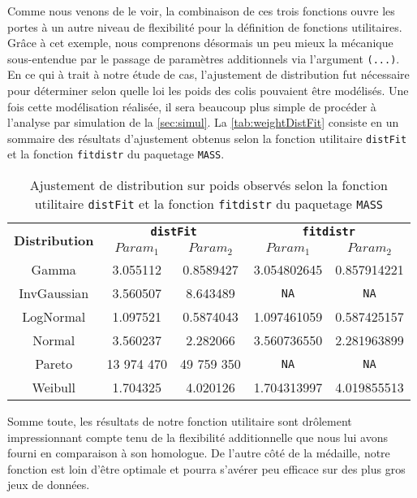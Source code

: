 Comme nous venons de le voir, la combinaison de ces trois fonctions ouvre les portes à un autre niveau de flexibilité pour la définition de fonctions utilitaires. Grâce à cet exemple, nous comprenons désormais un peu mieux la mécanique sous-entendue par le passage de paramètres additionnels via l'argument \texttt{(...)}. \\

En ce qui à trait à notre étude de cas, l'ajustement de distribution fut nécessaire pour déterminer selon quelle loi les poids des colis pouvaient être modélisés. Une fois cette modélisation réalisée, il sera beaucoup plus simple de procéder à l'analyse par simulation de la \autoref{sec:simul}. La \autoref{tab:weightDistFit} consiste en un sommaire des résultats d'ajustement obtenus selon la fonction utilitaire \texttt{distFit} et la fonction \texttt{fitdistr} du paquetage \texttt{MASS}. \\

\begin{table}
	\centering
	\begin{tabular}{ccccc}
		\multirow{2}{*}{\textbf{Distribution}} & \multicolumn{2}{c}{\textbf{\texttt{distFit}}} & \multicolumn{2}{c}{\textbf{\texttt{fitdistr}}} \\
		& \textbf{$Param_1$} & \textbf{$Param_2$} & \textbf{$Param_1$} & \textbf{$Param_2$} \\
		\hline
		Gamma & 3.055112 & 0.8589427 & 3.054802645 & 0.857914221 \\
		InvGaussian & 3.560507 & 8.643489 & \texttt{NA} & \texttt{NA} \\
		LogNormal & 1.097521 & 0.5874043 & 1.097461059 & 0.587425157 \\
		Normal & 3.560237 & 2.282066 & 3.560736550 & 2.281963899 \\
		Pareto & 13 974 470 & 49 759 350 & \texttt{NA} & \texttt{NA} \\
		Weibull & 1.704325 & 4.020126 & 1.704313997 & 4.019855513 \\	
	\end{tabular}
	\caption{Ajustement de distribution sur poids observés selon la fonction utilitaire \texttt{distFit} et la fonction \texttt{fitdistr} du paquetage \texttt{MASS}}
	\label{tab:weightDistFit}
\end{table} 


Somme toute, les résultats de notre fonction utilitaire sont drôlement impressionnant compte tenu de la flexibilité additionnelle que nous lui avons fourni en comparaison à son homologue. De l'autre côté de la médaille, notre fonction est loin d'être optimale et pourra s'avérer peu efficace sur des plus gros jeux de données. \\

